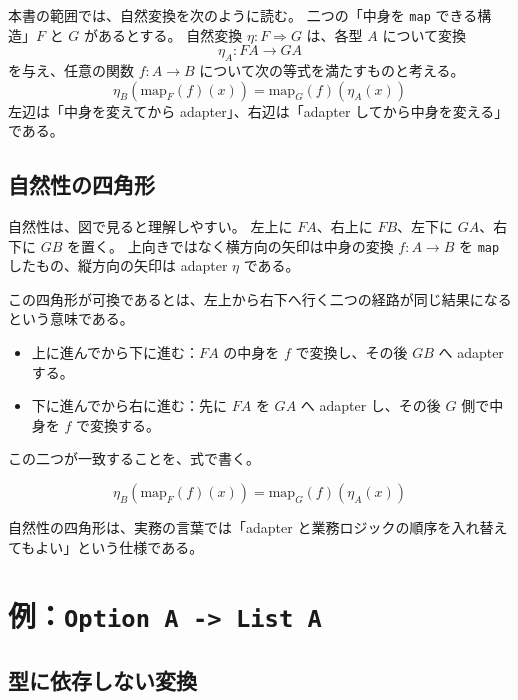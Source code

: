 \begin{definitionbox}
本書の範囲では、自然変換を次のように読む。
二つの「中身を \texttt{map} できる構造」\(F\) と \(G\) があるとする。
自然変換 \(\eta : F \Rightarrow G\) は、各型 \(A\) について変換
\[
  \eta_A : F A \to G A
\]
を与え、任意の関数 \(f : A \to B\) について次の等式を満たすものと考える。
\[
  \eta_B(\mathrm{map}_F(f)(x))
  =
  \mathrm{map}_G(f)(\eta_A(x))
\]
左辺は「中身を変えてから adapter」、右辺は「adapter してから中身を変える」である。
\end{definitionbox}

\subsection{自然性の四角形}

自然性は、図で見ると理解しやすい。
左上に \(F A\)、右上に \(F B\)、左下に \(G A\)、右下に \(G B\) を置く。
上向きではなく横方向の矢印は中身の変換 \(f : A \to B\) を \texttt{map} したもの、縦方向の矢印は adapter \(\eta\) である。


この四角形が可換であるとは、左上から右下へ行く二つの経路が同じ結果になるという意味である。

\begin{itemize}
\item 上に進んでから下に進む：\(F A\) の中身を \(f\) で変換し、その後 \(G B\) へ adapter する。
\item 下に進んでから右に進む：先に \(F A\) を \(G A\) へ adapter し、その後 \(G\) 側で中身を \(f\) で変換する。
\end{itemize}

この二つが一致することを、式で書く。

\[
  \eta_B(\mathrm{map}_F(f)(x))
  =
  \mathrm{map}_G(f)(\eta_A(x))
\]

自然性の四角形は、実務の言葉では「adapter と業務ロジックの順序を入れ替えてもよい」という仕様である。

\section{例：\texttt{Option A -> List A}}

\subsection{型に依存しない変換}

